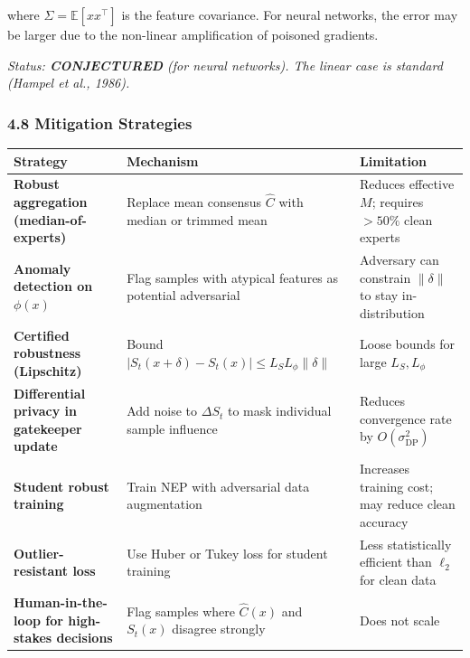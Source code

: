 \documentclass[
  12pt,
]{article}
\begin{document}
where \(\Sigma = \mathbb{E}[x x^\top]\) is the feature covariance. For
neural networks, the error may be larger due to the non-linear
amplification of poisoned gradients.

\emph{Status: \textbf{CONJECTURED} (for neural networks). The linear
case is standard (Hampel et al., 1986).}

\subsubsection{4.8 Mitigation Strategies}\label{mitigation-strategies-3}

\begin{longtable}[]{@{}
  >{\raggedright\arraybackslash}p{}
  >{\raggedright\arraybackslash}p{}
  >{\raggedright\arraybackslash}p{}@{}}
\toprule\noalign{}
\begin{minipage}[b]{\linewidth}\raggedright
Strategy
\end{minipage} & \begin{minipage}[b]{\linewidth}\raggedright
Mechanism
\end{minipage} & \begin{minipage}[b]{\linewidth}\raggedright
Limitation
\end{minipage} \\
\midrule\noalign{}
\endhead
\bottomrule\noalign{}
\endlastfoot
\textbf{Robust aggregation (median-of-experts)} & Replace mean consensus
\(\hat{C}\) with median or trimmed mean & Reduces effective \(M\);
requires \(>50\%\) clean experts \\
\textbf{Anomaly detection on \(\phi(x)\)} & Flag samples with atypical
features as potential adversarial & Adversary can constrain
\(\|\delta\|\) to stay in-distribution \\
\textbf{Certified robustness (Lipschitz)} & Bound
\(|S_t(x+\delta) - S_t(x)| \leq L_S L_\phi \|\delta\|\) & Loose bounds
for large \(L_S, L_\phi\) \\
\textbf{Differential privacy in gatekeeper update} & Add noise to
\(\Delta S_t\) to mask individual sample influence & Reduces convergence
rate by \(O(\sigma_{\text{DP}}^2)\) \\
\textbf{Student robust training} & Train NEP with adversarial data
augmentation & Increases training cost; may reduce clean accuracy \\
\textbf{Outlier-resistant loss} & Use Huber or Tukey loss for student
training & Less statistically efficient than \(\ell_2\) for clean
data \\
\textbf{Human-in-the-loop for high-stakes decisions} & Flag samples
where \(\hat{C}(x)\) and \(S_t(x)\) disagree strongly & Does not
scale \\
\end{longtable}
\end{document}
